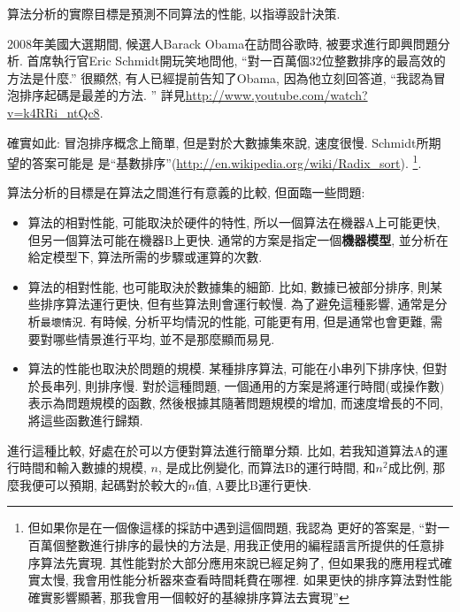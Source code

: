 \documentclass[10pt]{book}
\begin{document}
算法分析的實際目標是預測不同算法的性能, 以指導設計決策. 

2008年美國大選期間, 候選人Barack Obama在訪問谷歌時, 被要求進行即興問題分析. 
首席執行官Eric Schmidt開玩笑地問他, ``對一百萬個32位整數排序的最高效的方法是什麼.''
很顯然, 有人已經提前告知了Obama, 因為他立刻回答道, ``我認為冒泡排序起碼是最差的方法. ''
詳見\url{http://www.youtube.com/watch?v=k4RRi_ntQc8}.

確實如此: 冒泡排序概念上簡單, 但是對於大數據集來說, 速度很慢. 
Schmidt所期望的答案可能是
是``基數排序''(\url{http://en.wikipedia.org/wiki/Radix_sort}). \footnote{
但如果你是在一個像這樣的採訪中遇到這個問題, 我認為
更好的答案是, ``對一百萬個整數進行排序的最快的方法是, 
用我正使用的編程語言所提供的任意排序算法先實現. 
其性能對於大部分應用來說已經足夠了, 但如果我的應用程式確實太慢, 
我會用性能分析器來查看時間耗費在哪裡. 
如果更快的排序算法對性能確實影響顯著, 那我會用一個較好的基線排序算法去實現''}.

算法分析的目標是在算法之間進行有意義的比較, 但面臨一些問題:

\begin{itemize}

\item 算法的相對性能, 可能取決於硬件的特性, 所以一個算法在機器A上可能更快, 
但另一個算法可能在機器B上更快. 
通常的方案是指定一個{\bf 機器模型}, 並分析在給定模型下, 
算法所需的步驟或運算的次數. 

\item 算法的相對性能, 也可能取決於數據集的細節. 
比如, 數據已被部分排序, 則某些排序算法運行更快, 
但有些算法則會運行較慢. 
為了避免這種影響, 通常是分析{\tt 最壞情況}. 
有時候, 分析平均情況的性能, 可能更有用, 但是通常也會更難, 
需要對哪些情景進行平均, 並不是那麼顯而易見. 

\item 算法的性能也取決於問題的規模. 
某種排序算法, 可能在小串列下排序快, 但對於長串列, 則排序慢. 
對於這種問題, 一個通用的方案是將運行時間(或操作數)表示為問題規模的函數, 
然後根據其隨著問題規模的增加, 而速度增長的不同, 將這些函數進行歸類. 

\end{itemize}

進行這種比較, 好處在於可以方便對算法進行簡單分類. 
比如, 若我知道算法A的運行時間和輸入數據的規模, $n$, 是成比例變化, 
而算法B的運行時間, 和$n^2$成比例, 
那麼我便可以預期, 起碼對於較大的$n$值, A要比B運行更快. 
\end{document}

